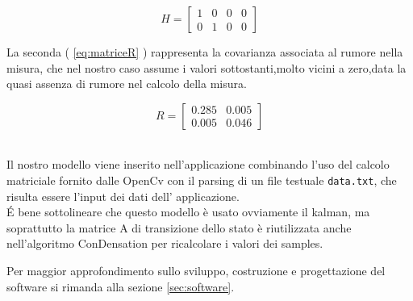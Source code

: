 \begin{equation} \label{eq:matriceH}
 H = \begin{bmatrix} 
1 & 0 & 0 & 0\\
0 & 1 & 0 & 0
\end{bmatrix}
\end{equation}


La seconda ( \ref{eq:matriceR} ) rappresenta la covarianza associata al rumore nella misura, che nel nostro caso assume i valori sottostanti,molto vicini a zero,data la quasi assenza di rumore nel calcolo della misura.


\begin{equation}\label{eq:matriceR}
 R = \begin{bmatrix} 
0.285 & 0.005\\
0.005 & 0.046
\end{bmatrix} 
\end{equation}

~\\
Il nostro modello viene inserito nell'applicazione combinando l'uso del calcolo matriciale fornito dalle OpenCv con il parsing di un file testuale \texttt{data.txt}, che risulta essere l'input dei dati dell' applicazione.\\

\'E bene sottolineare che questo modello è usato ovviamente il kalman, ma soprattutto la matrice A di transizione dello stato è riutilizzata anche nell'algoritmo ConDensation per ricalcolare i valori dei samples.


Per maggior approfondimento sullo sviluppo, costruzione e progettazione del software si rimanda alla sezione \ref{sec:software}.
